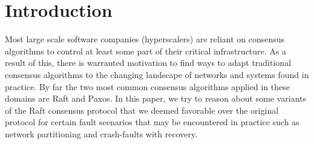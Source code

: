 \section{Introduction}
\label{sec:introduction}

Most large scale software companies (hyperscalers) are reliant on consensus algorithms to control at least some part of their critical infrastructure.
As a result of this, there is warranted motivation to find ways to adapt traditional consensus algorithms to the changing landscape of networks and systems found in practice.
By far the two most common consensus algorithms applied in these domains are Raft\cite{10.5555/2643634.2643666} and Paxos\cite{lamport_1998}.
In this paper, we  try to reason about some variants of the Raft consensus protocol that we deemed favorable over the original protocol for certain fault scenarios that may be encountered in practice such as network partitioning and crash-faults with recovery.





